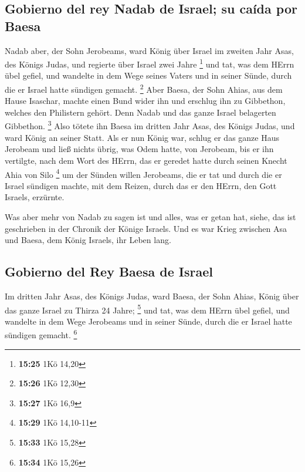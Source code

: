 \hypertarget{gobierno-del-rey-nadab-de-israel-su-cauxedda-por-baesa}{%
\subsection{Gobierno del rey Nadab de Israel; su caída por
Baesa}\label{gobierno-del-rey-nadab-de-israel-su-cauxedda-por-baesa}}

 Nadab aber, der Sohn Jerobeams, ward König über Israel
im zweiten Jahr Asas, des Königs Judas, und regierte über Israel zwei
Jahre \footnote{\textbf{15:25} 1Kö 14,20}  und tat, was
dem HErrn übel gefiel, und wandelte in dem Wege seines Vaters und in
seiner Sünde, durch die er Israel hatte sündigen gemacht. \footnote{\textbf{15:26}
  1Kö 12,30}  Aber Baesa, der Sohn Ahias, aus dem Hause
Isaschar, machte einen Bund wider ihn und erschlug ihn zu Gibbethon,
welches den Philistern gehört. Denn Nadab und das ganze Israel
belagerten Gibbethon. \footnote{\textbf{15:27} 1Kö 16,9} 
Also tötete ihn Baesa im dritten Jahr Asas, des Königs Judas, und ward
König an seiner Statt.  Als er nun König war, schlug er
das ganze Haus Jerobeam und ließ nichts übrig, was Odem hatte, von
Jerobeam, bis er ihn vertilgte, nach dem Wort des HErrn, das er geredet
hatte durch seinen Knecht Ahia von Silo \footnote{\textbf{15:29} 1Kö
  14,10-11}  um der Sünden willen Jerobeams, die er tat
und durch die er Israel sündigen machte, mit dem Reizen, durch das er
den HErrn, den Gott Israels, erzürnte.

 Was aber mehr von Nadab zu sagen ist und alles, was er
getan hat, siehe, das ist geschrieben in der Chronik der Könige Israels.
 Und es war Krieg zwischen Asa und Baesa, dem König
Israels, ihr Leben lang.

\hypertarget{gobierno-del-rey-baesa-de-israel}{%
\subsection{Gobierno del Rey Baesa de
Israel}\label{gobierno-del-rey-baesa-de-israel}}

 Im dritten Jahr Asas, des Königs Judas, ward Baesa, der
Sohn Ahias, König über das ganze Israel zu Thirza 24 Jahre; \footnote{\textbf{15:33}
  1Kö 15,28}  und tat, was dem HErrn übel gefiel, und
wandelte in dem Wege Jerobeams und in seiner Sünde, durch die er Israel
hatte sündigen gemacht. \footnote{\textbf{15:34} 1Kö 15,26}


